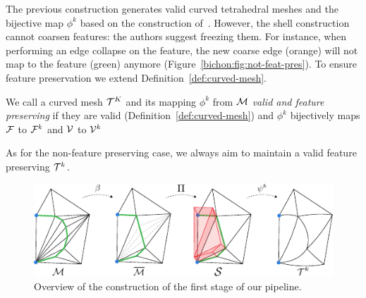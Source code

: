The previous construction generates valid curved tetrahedral meshes and the bijective map $\phi^k$ based on the construction of~\cite{jiang2020bijective}. However, the shell construction cannot coarsen features{:} the authors suggest {freezing} them. For instance, when performing an edge collapse on the feature, the new coarse edge (orange) will not map to the feature (green) anymore (Figure~\ref{bichon:fig:not-feat-pres}). 
To ensure feature preservation we extend Definition~\ref{def:curved-mesh}.
\begin{definition}\label{def:curved-features}
We call a curved mesh $\mathcal{T}^K$ and its mapping $\phi^k$ from $\mathcal{M}$ \emph{valid and feature preserving} if they are valid (Definition~\ref{def:curved-mesh}) and $\phi^k$ bijectively maps $\mathcal{F}$ to $\mathcal{F}^k$ and $\mathcal{V}$ to $\mathcal{V}^k$
\end{definition}
As for the non-feature preserving case, we always aim to maintain a valid feature preserving $\mathcal{T}^k$.


\begin{figure}
    \centering
    \includegraphics[width=\linewidth]{curve_meshing_in_shell_tex/figs/illustrations/stage-1.pdf}
    \caption{Overview of the construction of the first stage of our pipeline.}
    \label{bichon:fig:stage-1}
\end{figure}

